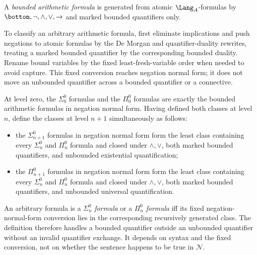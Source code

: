 \begin{definition}
A \emph{bounded arithmetic formula} is generated from atomic
\(\Lang_A\)-formulas by \(\bottom,\neg,\land,\lor,\to\) and marked bounded
quantifiers only.

To classify an arbitrary arithmetic formula, first eliminate implications and
push negations to atomic formulas by the De Morgan and quantifier-duality
rewrites, treating a marked bounded quantifier by the corresponding bounded
duality.  Rename bound variables by the fixed least-fresh-variable order when
needed to avoid capture.  This fixed conversion reaches negation normal form;
it does not move an unbounded quantifier across a bounded quantifier or a
connective.

At level zero, the \(\Sigma^0_0\) formulas and the \(\Pi^0_0\) formulas are
exactly the bounded arithmetic formulas in negation normal form.  Having
defined both classes at level \(n\), define the classes at level \(n+1\)
simultaneously as follows:
\begin{itemize}
  \item the \(\Sigma^0_{n+1}\) formulas in negation normal form form the least
        class containing every \(\Sigma^0_n\) and \(\Pi^0_n\) formula and
        closed under \(\land,\lor\), both marked bounded quantifiers, and
        unbounded existential quantification;
  \item the \(\Pi^0_{n+1}\) formulas in negation normal form form the least
        class containing every \(\Sigma^0_n\) and \(\Pi^0_n\) formula and
        closed under \(\land,\lor\), both marked bounded quantifiers, and
        unbounded universal quantification.
\end{itemize}
An arbitrary formula is a \emph{\(\Sigma^0_n\) formula} or a
\emph{\(\Pi^0_n\) formula} iff its fixed negation-normal-form conversion lies
in the corresponding recursively generated class.  The definition therefore
handles a bounded quantifier outside an unbounded quantifier without an
invalid quantifier exchange.  It depends on syntax and the fixed conversion,
not on whether the sentence happens to be true in \(\mathcal N\).
\end{definition}

